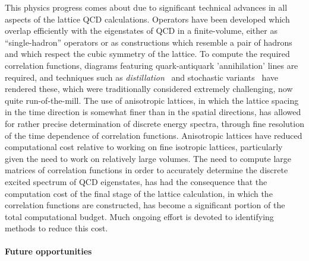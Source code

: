 This physics progress comes about due to significant technical advances in all aspects of the lattice QCD calculations. Operators have been developed which overlap efficiently with the eigenstates of QCD in a finite-volume, either as ``single-hadron'' operators or as constructions which resemble a pair of hadrons and which respect the cubic symmetry of the lattice. To compute the required correlation functions, diagrams featuring quark-antiquark 'annihilation' lines are required, and techniques such as \emph{distillation}~\cite{Peardon:2009gh} and stochastic variants~\cite{Morningstar:2011ka} have rendered these, which were traditionally considered extremely challenging, now quite run-of-the-mill. The use of anisotropic lattices, in which the lattice spacing in the time direction is somewhat finer than in the spatial directions, has allowed for rather precise determination of discrete energy spectra, through fine resolution of the time dependence of correlation functions. Anisotropic lattices have reduced computational cost relative to working on fine isotropic lattices, particularly given the need to work on relatively large volumes. The need to compute large matrices of correlation functions in order to accurately determine the discrete excited spectrum of QCD eigenstates, has had the consequence that the computation cost of the final stage of the lattice calculation, in which the correlation functions are constructed, has become a significant portion of the total computational budget. Much ongoing effort is devoted to identifying methods to reduce this cost. 









\paragraph{Future opportunities}

